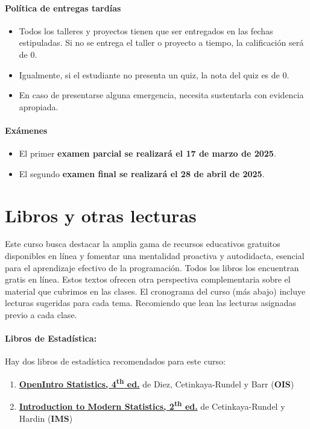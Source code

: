 \documentclass[10pt]{article}
\begin{document}
	\paragraph{Política de entregas tardías}
	\begin{itemize}
\item Todos los talleres y proyectos tienen que ser entregados en las fechas estipuladas. Si no se entrega el taller o proyecto a tiempo, la calificación será de 0.  

\item Igualmente, si el estudiante no presenta un quiz, la nota del quiz es de 0. 

\item En caso de presentarse alguna emergencia, necesita sustentarla con evidencia apropiada.
	\end{itemize}
	
	\paragraph{Exámenes}
	\begin{itemize}
		\item El primer \textbf{examen parcial se realizará el 17 de marzo de 2025}.
		\item El segundo \textbf{examen final se realizará el 28 de abril de 2025}.
	\end{itemize}
	
	
	\section*{Libros y otras lecturas}
	
	Este curso busca destacar la amplia gama de recursos educativos gratuitos disponibles en línea y fomentar una mentalidad proactiva y autodidacta, esencial para el aprendizaje efectivo de la programación. Todos los libros los encuentran gratis en línea. Estos textos ofrecen otra perspectiva complementaria sobre el material que cubrimos en las clases. El cronograma del curso (más abajo) incluye lecturas sugeridas para cada tema. Recomiendo que lean las lecturas asignadas previo a cada clase.
	
	\paragraph{Libros de Estadística:} Hay dos libros de estadística recomendados para este curso:
	
	\begin{enumerate}
		\item \href{https://www.openintro.org/book/os/}{\textbf{OpenIntro Statistics, 4\textsuperscript{th} ed.}} de Diez, Cetinkaya-Rundel y Barr (\textbf{OIS})
		\item \href{https://openintro-ims.netlify.app/}{\textbf{Introduction to Modern Statistics, 2\textsuperscript{th} ed.}} de Cetinkaya-Rundel y Hardin (\textbf{IMS})
	\end{enumerate}
	
\end{document}

